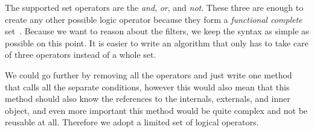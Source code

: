The supported set operators are the \emph{and}, \emph{or}, and \emph{not}. These three are enough to create any other possible logic operator because they form a \emph{functional complete} set~\cite{vanBenthem91}.
Because we want to reason about the filters, we keep the syntax as simple as possible on this point. It is easier to write an algorithm that only has to take care of three
operators instead of a whole set.

We could go further by removing all the operators and just write one method that calls all the separate
conditions, however this would also mean that this method should also know the references to the internals, externals,
and inner object, and even more important this method would be quite complex and not be reusable at all. Therefore we adopt a limited set
of logical operators.

